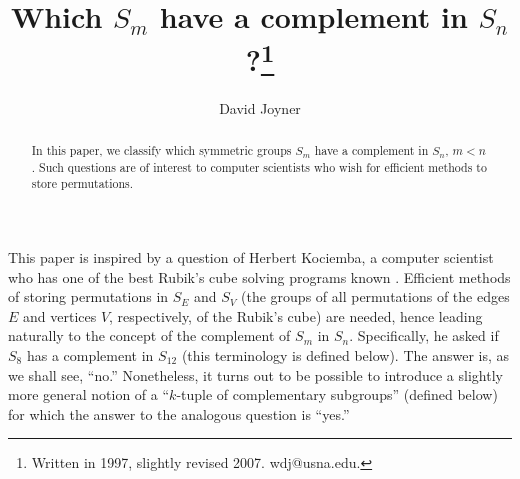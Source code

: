 

\newtheorem{theorem}{Theorem} 
\newtheorem{corollary}[theorem]{Corollary} 
\newtheorem{conjecture}[theorem]{Conjecture} 
\newtheorem{lemma}[theorem]{Lemma} 
\newtheorem{proposition}[theorem]{Proposition} 
\newtheorem{definition}[theorem]{Definition} 
\newtheorem{example}[theorem]{Example} 
\newtheorem{exercise}[theorem]{Exercise} 
\newtheorem{axiom}{Axiom} 
\newtheorem{remark}{Remark} 
\def\ppp{{\mathbb{P}}}
\def\aaa{{\mathbb{A}}}
\def\fff{{\mathbb{F}}}
\def\qqq{\mathbb{Q}}
\def\rrr{\mathbb{R}}
\def\ccc{\mathbb{C}}
\def\zzz{\mathbb{Z}}
\def\nnn{\mathbb{N}}
\def\pf{{\bf proof}:\ }
\def\qed{$\Box$}



\author{David Joyner}
\title{Which $S_m$ have a complement in $S_n$?\thanks{Written in 1997, 
slightly revised 2007. wdj@usna.edu.}}
\maketitle

\begin{abstract}
In this paper,
we classify which symmetric groups $S_m$ have a complement in $S_n$, 
$m<n$. Such questions are of interest to computer scientists
who wish for efficient methods to store permutations. 

\end{abstract}


This paper is inspired by a question of Herbert Kociemba,
a computer scientist who has one of the best Rubik's
cube solving programs known \cite{K}. Efficient methods of
storing permutations in $S_E$ and $S_V$
(the groups of all permutations of the edges $E$ and 
vertices $V$, respectively, of the Rubik's cube)
are needed, hence leading naturally to the concept
of the complement of $S_m$ in $S_n$. Specifically,
he asked if $S_8$ has a complement in $S_{12}$
(this terminology is defined below). The answer is,
as we shall see, ``no.'' Nonetheless, it turns out to be 
possible to introduce a slightly more general notion
of a ``$k$-tuple of complementary subgroups'' (defined below)
for which the answer to the analogous question is
``yes.''

